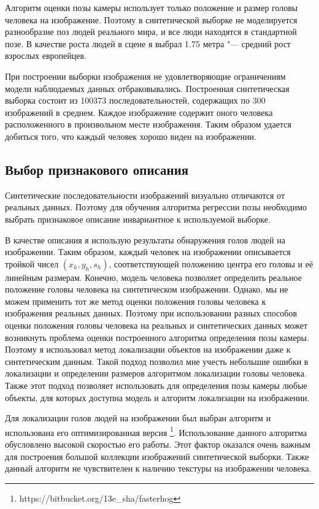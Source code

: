 Алгоритм оценки позы камеры использует только положение и размер головы человека на изображение. Поэтому в синтетической выборке не моделируется разнообразие поз людей реального мира, и все люди находятся в стандартной позе. В качестве роста людей в сцене я выбрал 1.75 метра "--- средний рост взрослых европейцев.

При построении выборки изображения не удовлетворяющие ограничениям модели наблюдаемых данных отбраковывались. Построенная синтетическая выборка состоит из 100373 последовательностей, содержащих по 300 изображений в среднем. Каждое изображение содержит оного человека расположенного в произвольном месте изображения. Таким образом удается добиться того, что каждый человек хорошо виден на изображении.

\subsection{Выбор признакового описания}

Синтетические последовательности изображений визуально отличаются от реальных данных. Поэтому для обучения алгоритма регрессии позы необходимо выбрать признаковое описание инвариантное к используемой выборке.

В качестве описания я использую результаты обнаружения голов людей на изображении. Таким образом, каждый человек на изображении описывается тройкой чисел $\left(x_h, y_h, s_h\right)$, соответствующей положению центра его головы и её линейным размерам. Конечно, модель человека \cite{pishchulin2015building} позволяет определить реальное положение головы человека на синтетическом изображении. Однако, мы не можем применить тот же метод оценки положения головы человека к изображения реальных данных. Поэтому при использовании разных способов оценки положения головы человека на реальных и синтетических данных может возникнуть проблема оценки построенного алгоритма определения позы камеры. Поэтому я использовал метод локализации объектов на изображении даже к синтетическим данным. Такой подход позволил мне учесть небольшие ошибки в локализации и определении размеров алгоритмом локализации головы человека. Также этот подход позволяет использовать для определения позы камеры любые объекты, для которых доступна модель и алгоритм локализации на изображении.

Для локализации голов людей на изображении был выбран алгоритм \cite{prisacariu_reid_tr2310_09} и использована его оптимизированная версия \footnote{https://bitbucket.org/13e\_sha/fasterhog}. Использование данного алгоритма обусловлено высокой скоростью его работы. Этот фактор оказался очень важным для построения большой коллекции изображений синтетической выборки. Также данный алгоритм не чувствителен к наличию текстуры на изображении человека.


